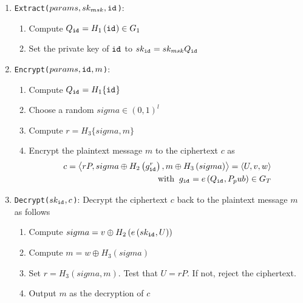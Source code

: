 {\begin{algorithm}
\begin{enumerate}
\begin{enumerate}
   \item Choose cryptographic hash functions
    \begin{enumerate}
     \item $H_1: \{ 0,1  \}^* \rightarrow G_1$
     \item $H_2: G_2 \rightarrow \{ 0,1 \}^l$
     \item $H_3: \{ 0,1 \}^l \rightarrow \left( 0,1 \right)^l$
    \end{enumerate}
  \end{enumerate}
  \item \texttt{Extract($params, sk_{msk}, \mathtt{id}_{}$)}:
   \begin{enumerate}
    \item Compute $Q_{\mathtt{id}_{}} = H_1 \left( \mathtt{id}_{} \right) \in G_1$
    \item Set the private key of $\mathtt{id}_{}$ to $sk_{\mathtt{id}_{}} = sk_{msk} Q_{\mathtt{id}_{}}$
   \end{enumerate}   \item \texttt{Encrypt($params, \mathtt{id}_{}, m$)}:
   \begin{enumerate}
    \item Compute $Q_{\mathtt{id}_{}} = H_1 \{ \mathtt{id}_{} \}$
    \item Choose a random $sigma \in \left( 0,1 \right)^l$
    \item Compute $r = H_3 \{ sigma, m \}$
    \item Encrypt the plaintext message $m$ to the ciphertext $c$ as
    \begin{equation*}
     \begin{split}
      c = \left< rP, sigma \oplus H_2 \left( g_{\mathtt{id}_{}}^r\right), m \oplus H_3 \left( sigma \right) \right> = \left< U, v, w \right> \\ 
     \; \; \textrm{with} \; \; g_{\mathtt{id}_{}} = e \left( Q_{\mathtt{id}_{}}, P_pub \right) \in G_T
     \end{split}
    \end{equation*}
   \end{enumerate}
   \item \texttt{Decrypt($sk_{\mathtt{id}_{}}, c$)}: Decrypt the ciphertext $c$ back to the plaintext message $m$ as follows
   \begin{enumerate}
    \item Compute $sigma = v \oplus H_2 \left( e \left( sk_{\mathtt{id}_{}}, U \right) \right)$
    \item Compute $m = w \oplus H_3 \left( sigma \right)$
    \item Set $r = H_3 \left( sigma, m \right)$. Test that $U = rP$. If not, reject the ciphertext.
    \item Output $m$ as the decryption of $c$
    \end{enumerate}
 \end{enumerate}
\end{algorithm}
\clearpage
}

